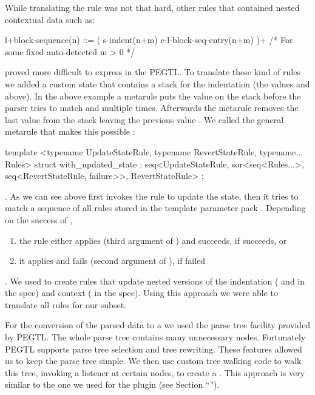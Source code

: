 While translating the rule  was not that hard, other rules that contained nested contextual data such as:

\begin{ccode}
l+block-sequence(n) ::= ( s-indent(n+m) c-l-block-seq-entry(n+m) )+
                        /* For some fixed auto-detected m > 0 */
\end{ccode}

proved more difficult to express in the \gls{PEGTL}. To translate these kind of rules we added a custom state that contains a stack for the indentation (the values  and  above). In the above example a metarule puts the value  on the stack before the parser tries to match  and  multiple times. Afterwards the metarule removes the last value from the stack leaving the previous value . We called the general metarule that makes this possible :

\begin{cppcode}
  template <typename UpdateStateRule,
            typename RevertStateRule,
            typename... Rules>
  struct with_updated_state :
  seq<UpdateStateRule,
      sor<seq<Rules...>,
          seq<RevertStateRule, failure>>,
      RevertStateRule> {};
\end{cppcode}

. As we can see above  first invokes the rule  to update the state, then it tries to match a sequence of all rules stored in the template parameter pack . Depending on the success of ,

\begin{enumerate}
  \item the rule  either applies  (third argument of ) and succeeds, if  succeeds, or
  \item it applies  and fails (second argument of ), if  failed
\end{enumerate}

. We used  to create rules that update nested versions of the indentation ( and  in the  spec) and context ( in the  spec). Using this approach we were able to translate all  rules for our subset.

For the conversion of the parsed data to a  we used the parse tree facility provided by \gls{PEGTL}. The whole parse tree contains many unnecessary nodes. Fortunately \gls{PEGTL} supports parse tree selection and tree rewriting. These features allowed us to keep the parse tree simple. We then use custom tree walking code to walk this tree, invoking a listener at certain nodes, to create a . This approach is very similar to the one we used for the \LinkYAwn{} plugin (see Section “”).

